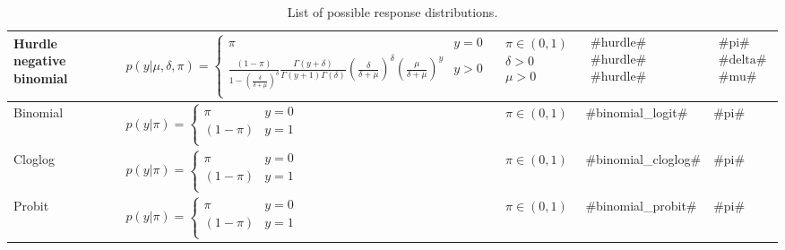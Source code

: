 \begin{sidewaystable}[htbp]
\begin{center}
\begin{tabular}{l l c l l}
Hurdle negative binomial &$p(y|\mu,\delta,\pi)=\begin{cases}
	\pi & y=0\\
		\frac{(1-\pi)}{1-\left(\frac{\delta}{\delta+\mu}\right)^{\delta}}\frac{\Gamma(y+\delta)}{\Gamma(y+1)\Gamma(\delta)}\left(\frac{\delta}{\delta+\mu}\right)^{\delta}\left(\frac{\mu}{\delta+\mu}\right)^{y} & y>0\\
			\end{cases}$&$\begin{matrix} \pi\in(0,1)\\\delta>0\\\mu>0
					 	\end{matrix}$ &$\begin{matrix} \text{#hurdle#}\\\text{#hurdle#}\\\text{#hurdle#}
					\end{matrix}$&$\begin{matrix} \text{#pi#}\\\text{#delta#}\\\text{#mu#}
					\end{matrix}$\\\hline
Binomial &$p(y|\pi)=\begin{cases}
	\pi & y=0\\
		(1-\pi) & y=1\\
			\end{cases}$&$\pi\in(0,1)$&#binomial\_logit#&#pi#\\\hline
Cloglog &$p(y|\pi)=\begin{cases}
	\pi & y=0\\
		(1-\pi) & y=1\\
			\end{cases}$&$\pi\in(0,1)$&#binomial\_cloglog#&#pi#\\\hline
Probit &$p(y|\pi)=\begin{cases}
	\pi & y=0\\
		(1-\pi) & y=1\\
			\end{cases}$&$\pi\in(0,1)$&#binomial\_probit#&#pi#\\
\hline\hline
\end{tabular}
\end{center}\caption{List of possible response distributions.}\label{tab:distrBayesX2}
\end{sidewaystable}

